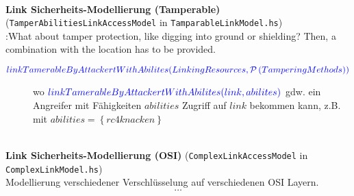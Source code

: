  \\
\textbf{Link Sicherheits-Modellierung (Tamperable) } (\texttt{TamperAbilitiesLinkAccessModel} in \texttt{TamparableLinkModel.hs})\\

\discuss:{What about tamper protection, like digging into ground or shielding? Then, a combination with the location has to be provided.}

\begin{description}
  \item[${\color{blue}{linkTamerableByAttackertWithAbilites(LinkingResources,\mathcal{P}\left(TamperingMethods\right))}}$] wo ${\color{blue}{linkTamerableByAttackertWithAbilites(link, abilites)}}$ gdw.
       ein Angreifer mit Fähigkeiten $abilities$ Zugriff auf $link$ bekommen kann,
       z.B. mit $abilities=\left\{rc4knacken\right\}$ 
\end{description}

 \\
\textbf{Link Sicherheits-Modellierung (OSI) } (\texttt{ComplexLinkAccessModel} in \texttt{ComplexLinkModel.hs})\\

Modellierung verschiedener  Verschlüsselung auf verschiedenen OSI Layern.
\[ \ldots \] 
